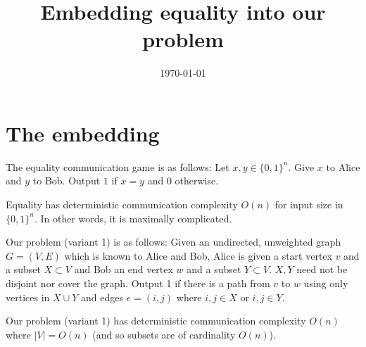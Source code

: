 \usepackage{ryblatex.sty}

\title{Embedding equality into our problem}
\author{}
\date{\today}



\maketitle

\section{The embedding}

\begin{definition}
The equality communication game is as follows: Let $x, y \in \{0,1\}^n$. Give $x$ to Alice and $y$ to Bob. Output $1$ if $x=y$ and $0$ otherwise.
\end{definition}

\begin{theorem}
Equality has deterministic communication complexity $O(n)$ for input size in $\{0,1\}^n$. In other words, it is maximally complicated.
\end{theorem}

\begin{definition}
Our problem (variant 1) is as follows: Given an undirected, unweighted graph $G = (V,E)$ which is known to Alice and Bob, Alice is given a start vertex $v$ and a subset $X \subset V$ and Bob an end vertex $w$ and a subset $Y \subset V$. $X,Y$ need not be disjoint nor cover the graph. Output 1 if there is a path from $v$ to $w$ using only vertices in $X \cup Y$ and edges $e = (i,j)$ where $i,j \in X$ or $i,j \in Y$.
\end{definition}

\begin{theorem}
Our problem (variant 1) has deterministic communication complexity $O(n)$ where $|V| = O(n)$ (and so subsets are of cardinality $O(n)$).
\end{theorem}

